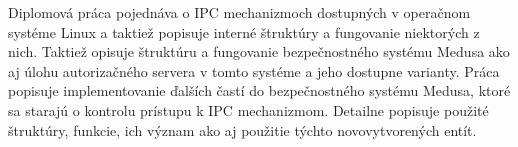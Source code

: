 Diplomová práca pojednáva o IPC mechanizmoch dostupných v operačnom systéme Linux a taktiež popisuje interné štruktúry a fungovanie niektorých z nich. Taktiež opisuje štruktúru a fungovanie bezpečnostného systému Medusa ako aj úlohu autorizačného servera v tomto systéme a jeho dostupne varianty. Práca popisuje implementovanie ďalších častí do bezpečnostného systému Medusa, ktoré sa starajú o kontrolu prístupu k IPC mechanizmom. Detailne popisuje použité štruktúry, funkcie, ich význam ako aj použitie týchto novovytvorených entít.